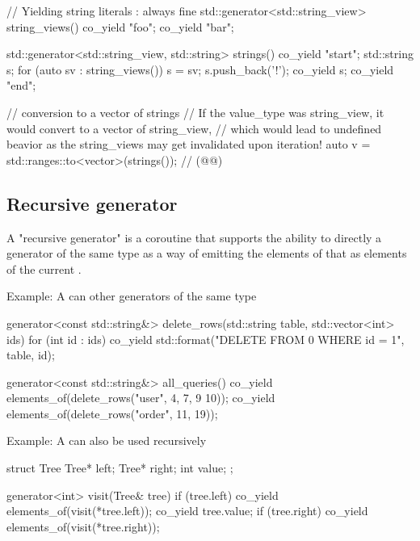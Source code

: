 \documentclass{wg21}
\begin{document}
\begin{colorblock}

// Yielding string literals : always fine
std::generator<std::string_view> string_views() {
    co_yield "foo";
    co_yield "bar";
}

std::generator<std::string_view, std::string> strings() {
    co_yield "start";
    std::string s;
    for (auto sv : string_views()) {
        s = sv;
        s.push_back('!');
        co_yield s;
    }
    co_yield "end";
}

// conversion to a vector of strings
// If the value_type was string_view, it would convert to a vector of string_view,
// which would lead to undefined beavior as the string_views may get invalidated upon iteration!
auto v = std::ranges::to<vector>(strings()); // (@{}@)

\end{colorblock}


\subsection{Recursive generator}

A "recursive generator" is a coroutine that supports the ability to directly 
a generator of the same type as a way of emitting the elements of that 
as elements of the current .

Example: A  can  other generators of the same type
\begin{colorblock}
    generator<const std::string&> delete_rows(std::string table, std::vector<int> ids) {
        for (int id : ids) {
            co_yield std::format("DELETE FROM {0} WHERE id = {1}", table, id);
        }
    }

    generator<const std::string&> all_queries() {
        co_yield elements_of(delete_rows("user", {4, 7, 9 10}));
        co_yield elements_of(delete_rows("order", {11, 19}));
    }
\end{colorblock}

Example: A  can also be used recursively
\begin{colorblock}
    struct Tree {
        Tree* left;
        Tree* right;
        int value;
    };

    generator<int> visit(Tree& tree) {
        if (tree.left) co_yield elements_of(visit(*tree.left));
        co_yield tree.value;
        if (tree.right) co_yield elements_of(visit(*tree.right));
    }
\end{colorblock}
\end{document}
